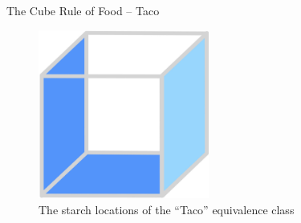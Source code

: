 \documentclass{beamer}
\begin{document}
\begin{frame}{The Cube Rule of Food -- Taco}
    \begin{figure}
        \includegraphics[width=0.5\textwidth]{images/cube_rule_of_food/taco/20_taco.jpg}
        \caption{\label{fig:taco-diagram}The starch locations of the ``Taco'' equivalence class}
    \end{figure}
\end{frame}
\end{document}
